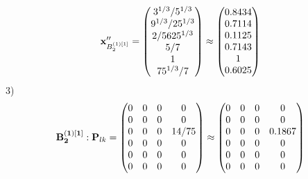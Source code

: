 \documentclass[10pt,a4paper]{article}
\begin{document}
	\[
		\bold{x}''_{B_2^{(1)[1]}} = 
		\begin{pmatrix}
			{{3^ {1 / 3}}} / {{5^ {1 / 3}}} \\
			{{9^ {1 / 3}}} / {{25^ {1 / 3}}} \\
			{{2}} / {{5625^ {1 / 3}}} \\
			{{5}} / {{7}} \\
			{1}{} \\
			{{75^ {1 / 3}}} / {{7}} \\
		\end{pmatrix}
		\approx
		\begin{pmatrix}
			0.8434   \\
			0.7114   \\
			0.1125   \\
			0.7143   \\
			1        \\
			0.6025   \\
		\end{pmatrix}
	\]
	3)
	\[
		\bold{B_2^{(1)[1]}}: \bold{P}_{lk} = 
		\begin{pmatrix}
			{{0}}{} & {{0}}{} & {{0}}{} & {{0}}{} \\
			{{0}}{} & {{0}}{} & {{0}}{} & {{0}}{} \\
			{{0}}{} & {{0}}{} & {{0}}{} & {{14}} / {{75}} \\
			{{0}}{} & {{0}}{} & {{0}}{} & {{0}}{} \\
			{{0}}{} & {{0}}{} & {{0}}{} & {{0}}{} \\
			{{0}}{} & {{0}}{} & {{0}}{} & {{0}}{} \\
		\end{pmatrix}
		\approx
		\begin{pmatrix}
			0        & 0        & 0        & 0        \\
			0        & 0        & 0        & 0        \\
			0        & 0        & 0        & 0.1867   \\
			0        & 0        & 0        & 0        \\
			0        & 0        & 0        & 0        \\
			0        & 0        & 0        & 0        \\
		\end{pmatrix}
	\]
\end{document}
